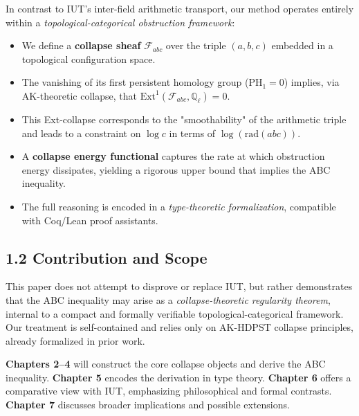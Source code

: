 \documentclass[11pt]{article}
\begin{document}
In contrast to IUT's inter-field arithmetic transport, our method operates entirely within a \emph{topological-categorical obstruction framework}:
\begin{itemize}
    \item We define a \textbf{collapse sheaf} $\mathcal{F}_{abc}$ over the triple $(a, b, c)$ embedded in a topological configuration space.
    \item The vanishing of its first persistent homology group ($\mathrm{PH}_1 = 0$) implies, via AK-theoretic collapse, that $\mathrm{Ext}^1(\mathcal{F}_{abc}, \mathbb{Q}_\ell) = 0$.
    \item This Ext-collapse corresponds to the "smoothability" of the arithmetic triple and leads to a constraint on $\log c$ in terms of $\log(\mathrm{rad}(abc))$.
    \item A \textbf{collapse energy functional} captures the rate at which obstruction energy dissipates, yielding a rigorous upper bound that implies the ABC inequality.
    \item The full reasoning is encoded in a \emph{type-theoretic formalization}, compatible with Coq/Lean proof assistants.
\end{itemize}

\subsection*{1.2 Contribution and Scope}
This paper does not attempt to disprove or replace IUT, but rather demonstrates that the ABC inequality may arise as a \emph{collapse-theoretic regularity theorem},
internal to a compact and formally verifiable topological-categorical framework. Our treatment is self-contained and relies only on AK-HDPST collapse principles, already formalized in prior work.

\textbf{Chapters 2--4} will construct the core collapse objects and derive the ABC inequality.\newline
\textbf{Chapter 5} encodes the derivation in type theory.\newline
\textbf{Chapter 6} offers a comparative view with IUT, emphasizing philosophical and formal contrasts.\newline
\textbf{Chapter 7} discusses broader implications and possible extensions.
\end{document}
